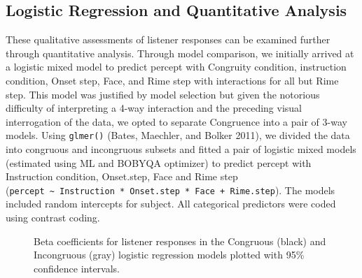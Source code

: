 \documentclass[
  letterpaper,
  DIV=11,
  numbers=noendperiod]{scrartcl}
\begin{document}
\subsection{Logistic Regression and Quantitative
Analysis}\label{sec-results-stats}

These qualitative assessments of listener responses can be examined
further through quantitative analysis. Through model comparison, we
initially arrived at a logistic mixed model to predict percept with
Congruity condition, instruction condition, Onset step, Face, and Rime
step with interactions for all but Rime step. This model was justified
by model selection but given the notorious difficulty of interpreting a
4-way interaction and the preceding visual interrogation of the data, we
opted to separate Congruence into a pair of 3-way models. Using
\texttt{glmer()} (Bates, Maechler, and Bolker 2011), we divided the data
into congruous and incongruous subsets and fitted a pair of logistic
mixed models (estimated using ML and BOBYQA optimizer) to predict
percept with Instruction condition, Onset.step, Face and Rime step
(\texttt{percept\ \textasciitilde{}\ Instruction\ *\ Onset.step\ *\ Face\ +\ Rime.step}).
The models included random intercepts for subject. All categorical
predictors were coded using contrast coding.

\begin{figure}


\caption{\label{fig-coefs}Beta coefficients for listener responses in
the Congruous (black) and Incongruous (gray) logistic regression models
plotted with 95\% confidence intervals.}

\end{figure}%
\end{document}
